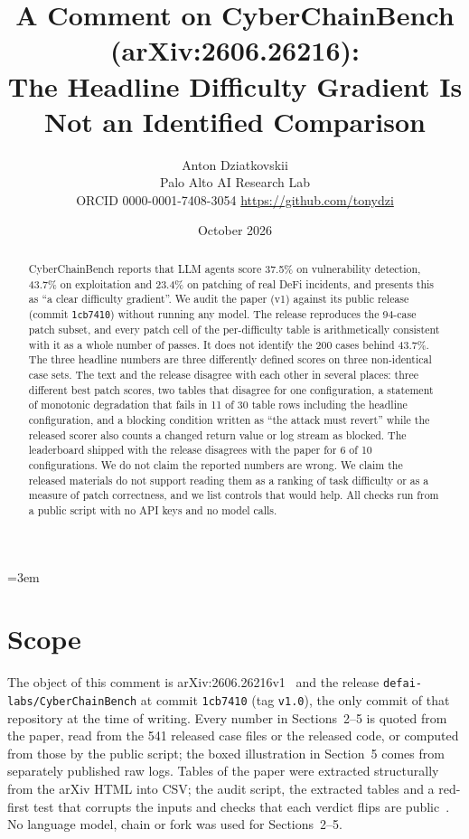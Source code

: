\documentclass[11pt]{article}
\title{A Comment on CyberChainBench (arXiv:2606.26216):\\
The Headline Difficulty Gradient Is Not an Identified Comparison}
\author{Anton Dziatkovskii\\
\small Palo Alto AI Research Lab\\
\small ORCID 0000-0001-7408-3054 \quad \url{https://github.com/tonydzi}}
\date{October 2026}
\newcommand{\code}[1]{\texttt{\small #1}}
\begin{document}
\sloppy\emergencystretch=3em
\maketitle

\begin{abstract}
CyberChainBench reports that LLM agents score 37.5\% on vulnerability detection, 43.7\% on exploitation and 23.4\% on patching of real DeFi incidents, and presents this as ``a clear difficulty gradient''. We audit the paper (v1) against its public release (commit \code{1cb7410}) without running any model. The release reproduces the 94-case patch subset, and every patch cell of the per-difficulty table is arithmetically consistent with it as a whole number of passes. It does not identify the 200 cases behind 43.7\%. The three headline numbers are three differently defined scores on three non-identical case sets. The text and the release disagree with each other in several places: three different best patch scores, two tables that disagree for one configuration, a statement of monotonic degradation that fails in 11 of 30 table rows including the headline configuration, and a blocking condition written as ``the attack must revert'' while the released scorer also counts a changed return value or log stream as blocked. The leaderboard shipped with the release disagrees with the paper for 6 of 10 configurations. We do not claim the reported numbers are wrong. We claim the released materials do not support reading them as a ranking of task difficulty or as a measure of patch correctness, and we list controls that would help. All checks run from a public script with no API keys and no model calls.
\end{abstract}

\section{Scope}
The object of this comment is arXiv:2606.26216v1~\cite{ccb} and the release \code{defai-labs/CyberChainBench} at commit \code{1cb7410} (tag \code{v1.0}), the only commit of that repository at the time of writing. Every number in Sections~2--5 is quoted from the paper, read from the 541 released case files or the released code, or computed from those by the public script; the boxed illustration in Section~5 comes from separately published raw logs. Tables of the paper were extracted structurally from the arXiv HTML into CSV; the audit script, the extracted tables and a red-first test that corrupts the inputs and checks that each verdict flips are public~\cite{audit}. No language model, chain or fork was used for Sections~2--5.
\end{document}
